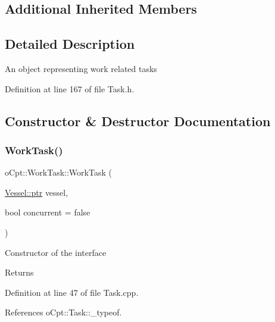 \subsection*{Additional Inherited Members}


\subsection{Detailed Description}
An object representing work related tasks 

Definition at line 167 of file Task.\+h.



\subsection{Constructor \& Destructor Documentation}
\hypertarget{classo_cpt_1_1_work_task_acc13280a8c8cd8879b0a2ef2239943bb}{}\label{classo_cpt_1_1_work_task_acc13280a8c8cd8879b0a2ef2239943bb} 
\subsubsection{\texorpdfstring{Work\+Task()}{WorkTask()}}
{\footnotesize\ttfamily o\+Cpt\+::\+Work\+Task\+::\+Work\+Task (\begin{DoxyParamCaption}\item[{\hyperlink{classo_cpt_1_1i_vessel_a43711a596f3bdfd0ca732ed3901edc97}{Vessel\+::ptr}}]{vessel,  }\item[{bool}]{concurrent = {\ttfamily false} }\end{DoxyParamCaption})}

Constructor of the interface \begin{DoxyReturn}{Returns}

\end{DoxyReturn}


Definition at line 47 of file Task.\+cpp.



References o\+Cpt\+::\+Task\+::\+\_\+typeof.

\hypertarget{classo_cpt_1_1_work_task_a9158f1f64ab798531258775607377383}{}\label{classo_cpt_1_1_work_task_a9158f1f64ab798531258775607377383} 
